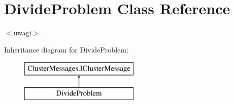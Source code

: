 \hypertarget{class_divide_problem}{}\section{Divide\+Problem Class Reference}
\label{class_divide_problem}


$<$uwagi$>$  


Inheritance diagram for Divide\+Problem\+:\begin{figure}[H]
\begin{center}
\leavevmode
\includegraphics[height=2.000000cm]{class_divide_problem}
\end{center}
\end{figure}
